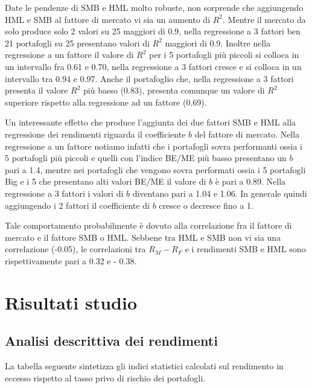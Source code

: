 Date le pendenze di SMB e HML molto robuste, non sorprende che aggiungendo HML e SMB al fattore di mercato vi sia un aumento di $R^2$. Mentre il mercato da solo produce solo 2 valori su 25 maggiori di 0.9, nella regressione a 3 fattori ben 21 portafogli su 25 presentano valori di $R^2$ maggiori di 0.9. Inoltre nella regressione a un fattore il valore di  $R^2$ per i 5 portafogli più piccoli si colloca in un intervallo fra 0.61 e 0.70, nella regressione a 3 fattori cresce e si colloca in un intervallo tra 0.94 e 0.97. Anche il portafoglio che, nella regressione a 3 fattori presenta il valore $R^2$ più basso (0.83), presenta comunque un valore di $R^2$ superiore rispetto alla regressione ad un fattore (0.69). 

Un interessante effetto che produce l'aggiunta dei due fattori SMB e HML alla regressione dei rendimenti riguarda il coefficiente $b$ del fattore di mercato. Nella regressione a un fattore notiamo infatti che i portafogli sovra performanti ossia i 5 portafogli più piccoli e quelli con l'indice BE/ME più basso presentano un $b$ pari a 1.4, mentre nei portafogli che vengono sovra performati ossia i 5 portafogli Big e i 5 che presentano alti valori BE/ME il valore di $b$ è pari a 0.89. Nella regressione a 3 fattori i valori di $b$ diventano pari a 1.04 e 1.06. In generale quindi aggiungendo i 2 fattori il coefficiente di $b$ cresce o decresce fino a 1. 

Tale comportamento probabilmente è dovuto alla correlazione fra il fattore di mercato e il fattore SMB o HML. Sebbene tra HML  e SMB non vi sia una correlazione (-0.05), le correlazioni tra $R_M- R_F$ e i rendimenti SMB e HML sono rispettivamente pari a 0.32 e - 0.38.

\section{Risultati studio}

\subsection{Analisi descrittiva dei rendimenti}

La tabella seguente sintetizza gli indici statistici calcolati sul rendimento in eccesso rispetto al tasso privo di rischio dei portafogli. 

